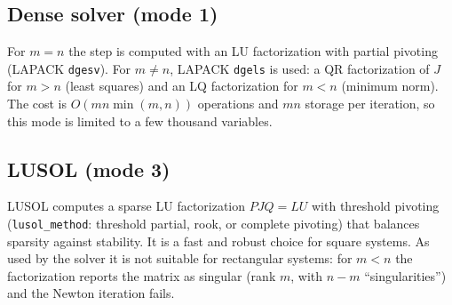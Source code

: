 \documentclass[11pt]{article}
\newcommand{\code}[1]{\texttt{#1}}
\begin{document}
\subsection{Dense solver (mode 1)}
For $m = n$ the step is computed with an LU factorization with partial pivoting (LAPACK
\code{dgesv}). For $m \ne n$, LAPACK \code{dgels} is used: a QR factorization of $J$ for $m > n$
(least squares) and an LQ factorization for $m < n$ (minimum norm). The cost is
$O(m n \min(m,n))$ operations and $mn$ storage per iteration, so this mode is limited to a few
thousand variables.

\subsection{LUSOL (mode 3)}
LUSOL \cite{lusol} computes a sparse LU factorization $P J Q = L U$ with threshold pivoting
(\code{lusol\_method}: threshold partial, rook, or complete pivoting) that balances sparsity
against stability. It is a fast and robust choice for square systems. As used by the solver it is
not suitable for rectangular systems: for $m < n$ the factorization reports the matrix as singular
(rank $m$, with $n-m$ ``singularities'') and the Newton iteration fails.
\end{document}
